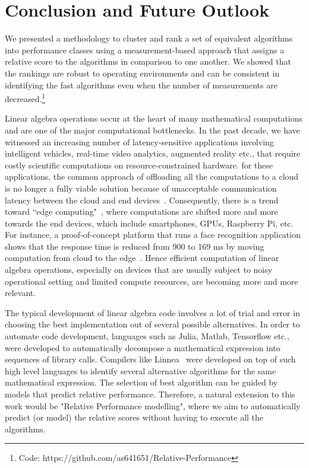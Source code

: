 \documentclass[conference]{IEEEtran}
\begin{document}
\section{Conclusion and Future Outlook}
\label{sec:con}
We presented a methodology to cluster and rank a set of equivalent algorithms into performance classes using a
measurement-based approach that assigns a relative score to the algorithms in comparison to one another. We showed that
the rankings are robust to operating environments 
and can be consistent in identifying the fast algorithms even when the
number of measurements are decreased.\footnote{Code: https://github.com/as641651/Relative-Performance}


Linear algebra operations occur at the heart of many mathematical computations and are one of the major computational
bottlenecks.  In the past decade, we have witnessed an increasing number of latency-sensitive applications involving
intelligent vehicles\cite{connectedvehicles}, real-time video analytics\cite{videoanalytics}, augmented
reality\cite{arvr} etc., that require costly scientific computations on resource-constrained hardware. for these
applications, the common approach
of offloading all the computations to a cloud is no longer a fully viable solution because of unacceptable communication
latency between the cloud and end devices~\cite{surveyMCC,towardsEdgeComputing}. Consequently, there is a trend toward
``edge computing"~\cite{edgeComputing2016,towardsEdgeComputing,edgeComputing2015}, where computations are shifted more
and more towards the end devices, which include smartphones, GPUs, Raspberry Pi, etc. For instance, a proof-of-concept
platform that runs a face recognition application shows that the response time is reduced from 900 to
169 ms by moving computation from cloud to the edge~\cite{facerecog}. Hence efficient computation of linear algebra operations, especially on devices that are usually subject to noisy operational setting and limited compute resources, are becoming more and more relevant.  

The typical development of linear algebra code involves a lot of trial and error in choosing the best implementation out
of several possible alternatives. In order to automate code development, languages such as Julia\cite{julia}, Matlab\cite{MatlabOTB}, Tensorflow\cite{tensorflow} etc., were developed to automatically decompose a mathematical expression into sequences of library calls. Compilers like Linnea~\cite{barthels2019linnea} were developed on top of such high level languages to identify several alternative algorithms for the same mathematical expression. The selection of best algorithm can be guided by models that predict relative performance. Therefore, a natural extension to this work would be "Relative Performance modelling", where we aim to automatically predict (or model) the relative scores without having to execute all the algorithms.
\end{document}
